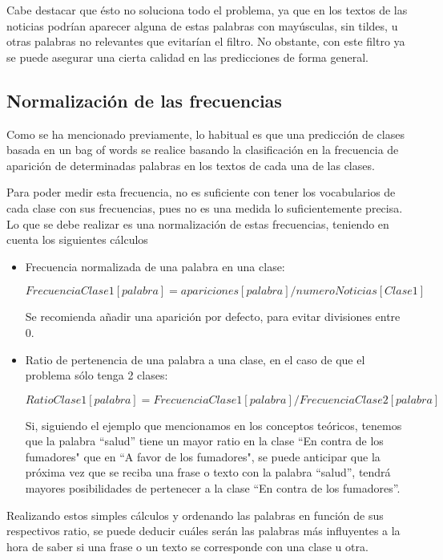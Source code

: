 Cabe destacar que ésto no soluciona todo el problema, ya que en los textos de las noticias podrían aparecer alguna de estas palabras con mayúsculas, sin tildes, u otras palabras no relevantes que evitarían el filtro. No obstante, con este filtro ya se puede asegurar una cierta calidad en las predicciones de forma general.

\subsection{Normalización de las frecuencias}

Como se ha mencionado previamente, lo habitual es que una predicción de clases basada en un bag of words se realice basando la clasificación en la frecuencia de aparición de determinadas palabras en los textos de cada una de las clases.

Para poder medir esta frecuencia, no es suficiente con tener los vocabularios de cada clase con sus frecuencias, pues no es una medida lo suficientemente precisa. Lo que se debe realizar es una normalización de estas frecuencias, teniendo en cuenta los siguientes cálculos \cite{spamtutorial}

\begin{itemize}

\item Frecuencia normalizada de una palabra en una clase:

\[ FrecuenciaClase1[palabra] = apariciones[palabra] / numeroNoticias[Clase1] \]

Se recomienda añadir una aparición por defecto, para evitar divisiones entre 0.

\item Ratio de pertenencia de una palabra a una clase, en el caso de que el problema sólo tenga 2 clases:

\[ RatioClase1[palabra] = FrecuenciaClase1[palabra] / FrecuenciaClase2[palabra] \]

Si, siguiendo el ejemplo que mencionamos en los conceptos teóricos, tenemos que la palabra ``salud'' tiene un mayor ratio en la clase ``En contra de los fumadores" que en ``A favor de los fumadores", se puede anticipar que la próxima vez que se reciba una frase o texto con la palabra ``salud'', tendrá mayores posibilidades de pertenecer a la clase ``En contra de los fumadores''.

\end{itemize}

Realizando estos simples cálculos y ordenando las palabras en función de sus respectivos ratio, se puede deducir cuáles serán las palabras más influyentes a la hora de saber si una frase o un texto se corresponde con una clase u otra.

